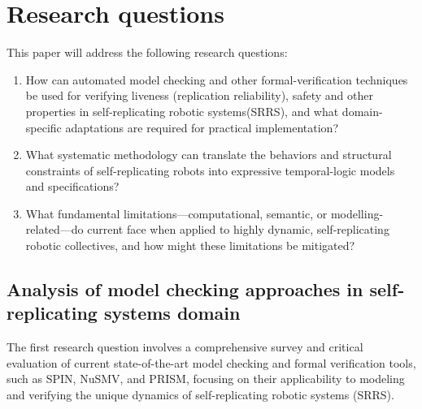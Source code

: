 
\chapter{Research questions} \label{research_questions}


This paper will address the following research questions:
\begin{enumerate}
    \item How can automated model checking and other formal-verification 
        techniques be used for verifying liveness (replication reliability),
        safety and other properties in self-replicating robotic systems(SRRS), 
        and what domain-specific adaptations are required for practical implementation?
    \item What systematic methodology can translate the behaviors and 
        structural constraints of self-replicating robots into expressive 
        temporal-logic models and specifications?
    \item What fundamental limitations—computational, semantic, or 
        modelling-related—do current face when applied to highly dynamic, 
        self-replicating robotic collectives, and how might these limitations be mitigated?
\end{enumerate}


\section{Analysis of model checking approaches in self-replicating systems domain}

%
%
The first research question involves a comprehensive survey and critical 
evaluation of current state-of-the-art model checking and formal verification 
tools, such as SPIN, NuSMV, and PRISM, focusing on their applicability to modeling 
and verifying the unique dynamics of self-replicating robotic systems (SRRS). 

